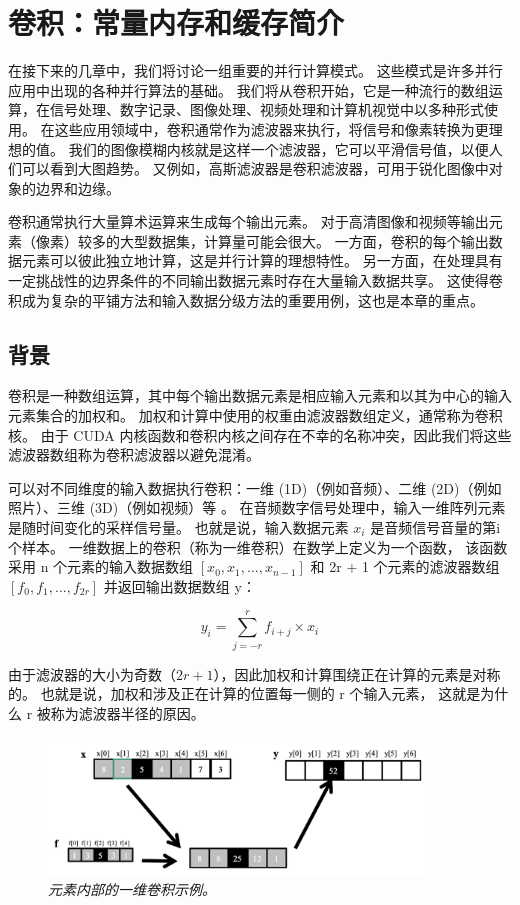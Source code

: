 \section{卷积：常量内存和缓存简介}
在接下来的几章中，我们将讨论一组重要的并行计算模式。 这些模式是许多并行应用中出现的各种并行算法的基础。 
我们将从卷积开始，它是一种流行的数组运算，在信号处理、数字记录、图像处理、视频处理和计算机视觉中以多种形式使用。 
在这些应用领域中，卷积通常作为滤波器来执行，将信号和像素转换为更理想的值。 
我们的图像模糊内核就是这样一个滤波器，它可以平滑信号值，以便人们可以看到大图趋势。 
又例如，高斯滤波器是卷积滤波器，可用于锐化图像中对象的边界和边缘。

卷积通常执行大量算术运算来生成每个输出元素。 对于高清图像和视频等输出元素（像素）较多的大型数据集，计算量可能会很大。 
一方面，卷积的每个输出数据元素可以彼此独立地计算，这是并行计算的理想特性。 
另一方面，在处理具有一定挑战性的边界条件的不同输出数据元素时存在大量输入数据共享。 
这使得卷积成为复杂的平铺方法和输入数据分级方法的重要用例，这也是本章的重点。

\subsection{背景}
卷积是一种数组运算，其中每个输出数据元素是相应输入元素和以其为中心的输入元素集合的加权和。 
加权和计算中使用的权重由滤波器数组定义，通常称为卷积核。 
由于 CUDA 内核函数和卷积内核之间存在不幸的名称冲突，因此我们将这些滤波器数组称为卷积滤波器以避免混淆。

可以对不同维度的输入数据执行卷积：一维 (1D)（例如音频）、二维 (2D)（例如照片）、三维 (3D)（例如视频）等 。 
在音频数字信号处理中，输入一维阵列元素是随时间变化的采样信号量。 也就是说，输入数据元素 $x_i$ 是音频信号音量的第i个样本。 
一维数据上的卷积（称为一维卷积）在数学上定义为一个函数，
该函数采用 n 个元素的输入数据数组 $[x_0 , x_1 , \ldots , x_{n-1} ]$ 
和 2r + 1 个元素的滤波器数组 $[f_0 , f_1 , \ldots , f_{2r} ]$ 并返回输出数据数组 y：

$$
y_i = \sum^r_{j=-r} f_{i+j}\times x_i
$$

由于滤波器的大小为奇数（$2r + 1$），因此加权和计算围绕正在计算的元素是对称的。
也就是说，加权和涉及正在计算的位置每一侧的 r 个输入元素， 这就是为什么 r 被称为滤波器半径的原因。

\begin{figure}[H]
	\centering
	\includegraphics[width=0.9\textwidth]{figs/F7.1.png}
	\caption{\textit{元素内部的一维卷积示例。}}
\end{figure}


